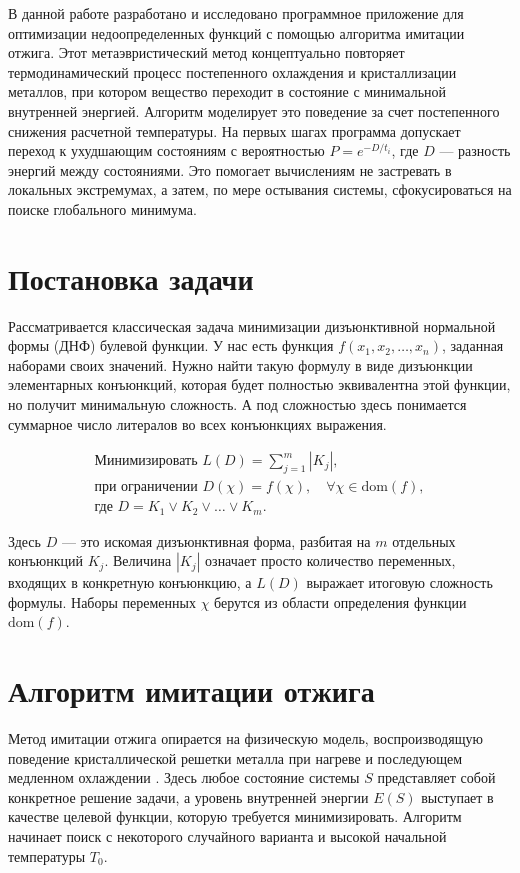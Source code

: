 \documentclass[14pt]{extarticle}
\begin{document}
В данной работе разработано и исследовано программное приложение для оптимизации недоопределенных функций с помощью алгоритма имитации отжига. Этот метаэвристический метод концептуально повторяет термодинамический процесс постепенного охлаждения и кристаллизации металлов, при котором вещество переходит в состояние с минимальной внутренней энергией. Алгоритм моделирует это поведение за счет постепенного снижения расчетной температуры. На первых шагах программа допускает переход к ухудшающим состояниям с вероятностью $P = e^{-D/t_i}$, где $D$ --- разность энергий между состояниями. Это помогает вычислениям не застревать в локальных экстремумах, а затем, по мере остывания системы, сфокусироваться на поиске глобального минимума.

\newpage 

\section*{Постановка задачи}

Рассматривается классическая задача минимизации дизъюнктивной нормальной формы (ДНФ) булевой функции. У нас есть функция $f(x_1, x_2, \dots, x_n)$, заданная наборами своих значений. Нужно найти такую формулу в виде дизъюнкции элементарных конъюнкций, которая будет полностью эквивалентна этой функции, но получит минимальную сложность. А под сложностью здесь понимается суммарное число литералов во всех конъюнкциях выражения.

\[
\begin{gathered}
\text{Минимизировать } L(D) = \sum_{j=1}^{m} |K_j|, \\
\text{при ограничении } D(\chi) = f(\chi), \quad \forall \chi \in \text{dom}(f), \\
\text{где } D = K_1 \vee K_2 \vee \dots \vee K_m.
\end{gathered}
\]

Здесь $D$ --- это искомая дизъюнктивная форма, разбитая на $m$ отдельных конъюнкций $K_j$. Величина $|K_j|$ означает просто количество переменных, входящих в конкретную конъюнкцию, а $L(D)$ выражает итоговую сложность формулы. Наборы переменных $\chi$ берутся из области определения функции $\text{dom}(f)$.

\section*{Алгоритм имитации отжига}

Метод имитации отжига опирается на физическую модель, воспроизводящую поведение кристаллической решетки металла при нагреве и последующем медленном охлаждении \cite{skobcov}. Здесь любое состояние системы $S$ представляет собой конкретное решение задачи, а уровень внутренней энергии $E(S)$ выступает в качестве целевой функции, которую требуется минимизировать. Алгоритм начинает поиск с некоторого случайного варианта и высокой начальной температуры $T_0$.
\end{document}
